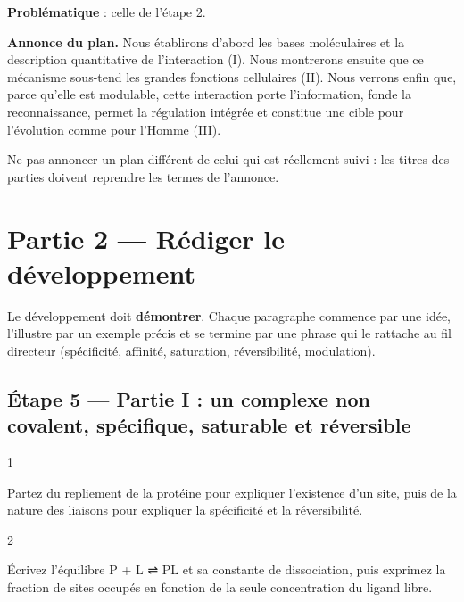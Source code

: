 \documentclass[11pt,a4paper]{article}
\begin{document}
\textbf{Problématique} : celle de l'étape 2.

\textbf{Annonce du plan.} Nous établirons d'abord les bases moléculaires et la description quantitative de l'interaction (I). Nous montrerons ensuite que ce mécanisme sous-tend les grandes fonctions cellulaires (II). Nous verrons enfin que, parce qu'elle est modulable, cette interaction porte l'information, fonde la reconnaissance, permet la régulation intégrée et constitue une cible pour l'évolution comme pour l'Homme (III).

\begin{piege}

Ne pas annoncer un plan différent de celui qui est réellement suivi : les titres des parties doivent reprendre les termes de l'annonce.

\end{piege}

\hypertarget{partie-2-ruxe9diger-le-duxe9veloppement}{%
\section{Partie 2 --- Rédiger le développement}\label{partie-2-ruxe9diger-le-duxe9veloppement}}

Le développement doit \textbf{démontrer}. Chaque paragraphe commence par une idée, l'illustre par un exemple précis et se termine par une phrase qui le rattache au fil directeur (spécificité, affinité, saturation, réversibilité, modulation).

\hypertarget{uxe9tape-5-partie-i-un-complexe-non-covalent-spuxe9cifique-saturable-et-ruxe9versible}{%
\subsection{Étape 5 --- Partie I : un complexe non covalent, spécifique, saturable et réversible}\label{uxe9tape-5-partie-i-un-complexe-non-covalent-spuxe9cifique-saturable-et-ruxe9versible}}

\begin{indication}{1}

Partez du repliement de la protéine pour expliquer l'existence d'un site, puis de la nature des liaisons pour expliquer la spécificité et la réversibilité.

\end{indication}

\begin{indication}{2}

Écrivez l'équilibre P + L ⇌ PL et sa constante de dissociation, puis exprimez la fraction de sites occupés en fonction de la seule concentration du ligand libre.

\end{indication}
\end{document}
